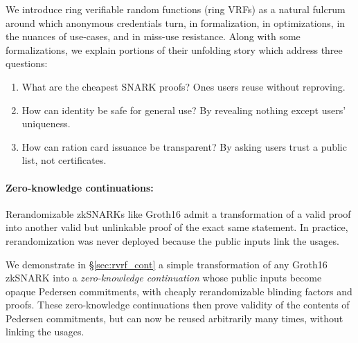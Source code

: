 
\def\qaudbreak{\eprint{\quad}{\\}}


We introduce ring verifiable random functions (ring VRFs) as a natural
fulcrum around which anonymous credentials turn, in formalization,
in optimizations, in the nuances of use-cases, and in miss-use resistance.
%
Along with some formalizations, we explain portions of their unfolding
story which address three questions:
\begin{enumerate} 
\item
What are the cheapest SNARK proofs?  \qaudbreak
Ones users reuse without reproving.
\item
How can identity be safe for general use?  \qaudbreak
By revealing nothing except users' uniqueness.
\item
How can ration card issuance be transparent?  \qaudbreak
By asking users trust a public list, not certificates.
\end{enumerate}

\paragraph{Zero-knowledge continuations:}

Rerandomizable zkSNARKs like Groth16 \cite{Groth16} admit a
transformation of a valid proof into another valid but unlinkable
proof of the exact same statement.  In practice, rerandomization
was never deployed because the public inputs link the usages.

We demonstrate in \S\ref{sec:rvrf_cont} a simple transformation of
any Groth16 zkSNARK into a {\it zero-knowledge continuation} whose
public inputs become opaque Pedersen commitments, with cheaply
rerandomizable blinding factors and proofs.
These zero-knowledge continuations then prove validity of the contents
of Pedersen commitments, but can now be reused arbitrarily many times,
without linking the usages. 

